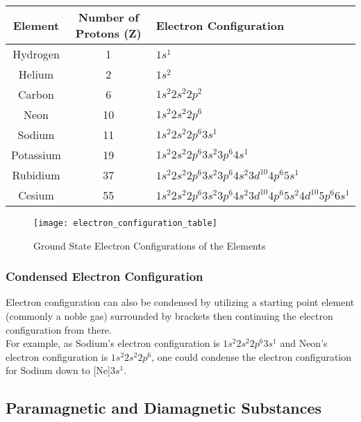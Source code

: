 \begin{table}[H]
\centering
\begin{tabular}{|c|c|l|}
\hline
Element & Number of Protons (Z) & Electron Configuration \\
\hline
Hydrogen & 1 & $1s^{1}$ \\
\hline
Helium & 2 & $1s^{2}$ \\
\hline
Carbon & 6 & $1s^{2} 2s^{2} 2p^{2}$ \\
\hline
Neon & 10 & $1s^{2} 2s^{2} 2p^{6}$ \\
\hline
Sodium & 11 & $1s^{2} 2s^{2} 2p^{6} 3s^{1}$ \\
\hline
Potassium & 19 & $1s^{2} 2s^{2} 2p^{6} 3s^{2} 3p^{6} 4s^{1}$ \\
\hline
Rubidium & 37 & $1s^{2} 2s^{2} 2p^{6} 3s^{2} 3p^{6} 4s^{2} 3d^{10} 4p^{6} 5s^{1}$ \\
\hline
Cesium & 55 & $1s^{2} 2s^{2} 2p^{6} 3s^{2} 3p^{6} 4s^{2} 3d^{10} 4p^{6} 5s^{2} 4d^{10} 5p^{6} 6s^{1}$ \\
\hline
\end{tabular}
\end{table}

\begin{figure}[H]
	\centering
	\texttt{[image: electron\_configuration\_table]}
	\caption{Ground State Electron Configurations of the Elements}
\end{figure}

\subsubsection{Condensed Electron Configuration}

Electron configuration can also be condensed by utilizing a starting point element (commonly a noble gas) surrounded by brackets then continuing the electron configuration from there. \\

\noindent
For example, as Sodium's electron configuration is $1s^{2} 2s^{2} 2p^{6} 3s^{1}$ and Neon's electron configuration is $1s^{2} 2s^{2} 2p^{6}$, one could condense the electron configuration for Sodium down to [Ne]$3s^{1}$. \\

\noindent
{}

\subsection{Paramagnetic and Diamagnetic Substances}

